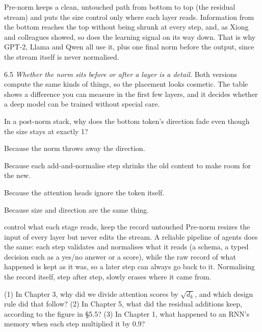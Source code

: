 \Why Pre-norm keeps a clean, untouched path from bottom to top (the residual stream) and puts the size control
only where each layer reads. Information from the bottom reaches the top without being shrunk at every step, and,
as Xiong and colleagues showed, so does the learning signal on its way down. That is why GPT-2, Llama and Qwen
all use it, plus one final norm before the output, since the stream itself is never normalised.

\begin{wrongidea}{6.5}
\emph{Whether the norm sits before or after a layer is a detail.} Both versions compute the same kinds of
things, so the placement looks cosmetic. The table shows a difference you can measure in the first few layers,
and it decides whether a deep model can be trained without special care.
\end{wrongidea}

\begin{checkq}
In a post-norm stack, why does the bottom token's direction fade even though the size stays at exactly 1?
\begin{options}
\item Because the norm throws away the direction.
\item Because each add-and-normalise step shrinks the old content to make room for the new.
\item Because the attention heads ignore the token itself.
\item Because size and direction are the same thing.
\end{options}
\end{checkq}

\begin{principle}{control what each stage reads, keep the record untouched}
Pre-norm resizes the input of every layer but never edits the stream. A reliable pipeline of agents does the same:
each step validates and normalises what it reads (a schema, a typed decision such as a yes/no answer or a
score), while the raw record of what happened is kept as it was, so a later
step can always go back to it. Normalising the record itself, step after step, slowly erases where it came from.
\end{principle}


\begin{lookingback}
(1) In Chapter 3, why did we divide attention scores by $\sqrt{d_k}$, and which design rule did that follow?
(2) In Chapter 5, what did the residual additions keep, according to the figure in \S5.5? (3) In Chapter 1,
what happened to an RNN's memory when each step multiplied it by 0.9?
\end{lookingback}

